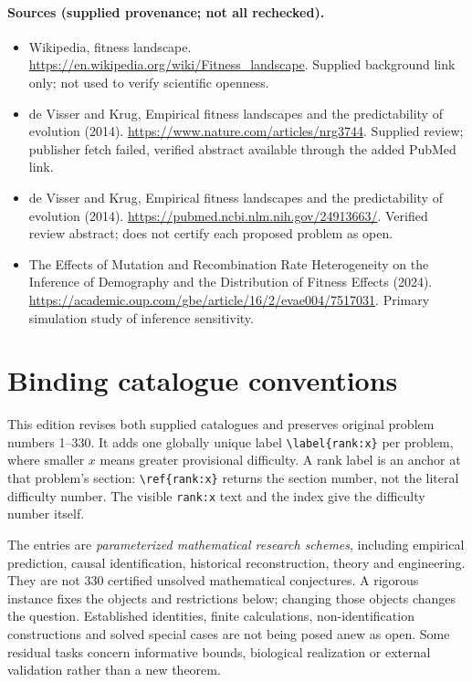 \documentclass[11pt]{article}
\begin{document}
\paragraph{Sources (supplied provenance; not all rechecked).}
\begin{itemize}
\item Wikipedia, fitness landscape. \url{https://en.wikipedia.org/wiki/Fitness_landscape}. Supplied background link only; not used to verify scientific openness.
\item de Visser and Krug, Empirical fitness landscapes and the predictability of evolution (2014). \url{https://www.nature.com/articles/nrg3744}. Supplied review; publisher fetch failed, verified abstract available through the added PubMed link.
\item de Visser and Krug, Empirical fitness landscapes and the predictability of evolution (2014). \url{https://pubmed.ncbi.nlm.nih.gov/24913663/}. Verified review abstract; does not certify each proposed problem as open.
\item The Effects of Mutation and Recombination Rate Heterogeneity on the Inference of Demography and the Distribution of Fitness Effects (2024). \url{https://academic.oup.com/gbe/article/16/2/evae004/7517031}. Primary simulation study of inference sensitivity.
\end{itemize}


\section*{Binding catalogue conventions}
This edition revises both supplied catalogues and preserves original problem numbers 1--330. It adds one globally unique label \verb|\label{rank:x}| per problem, where smaller $x$ means greater provisional difficulty. A rank label is an anchor at that problem's section: \verb|\ref{rank:x}| returns the section number, not the literal difficulty number. The visible \texttt{rank:x} text and the index give the difficulty number itself.

The entries are \emph{parameterized mathematical research schemes}, including empirical prediction, causal identification, historical reconstruction, theory and engineering. They are not 330 certified unsolved mathematical conjectures. A rigorous instance fixes the objects and restrictions below; changing those objects changes the question. Established identities, finite calculations, non-identification constructions and solved special cases are not being posed anew as open. Some residual tasks concern informative bounds, biological realization or external validation rather than a new theorem.
\end{document}
